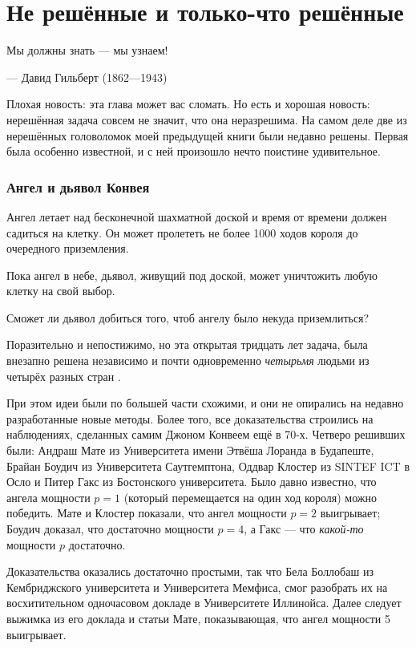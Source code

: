 \chapter{Не решённые и только-что решённые}


\setlength{\epigraphwidth}{.80\textwidth}
\epigraph{Мы должны знать --- мы узнаем!
}{--- Давид Гильберт (1862---1943)}

Плохая новость: эта глава может вас сломать.
Но есть и хорошая новость: нерешённая задача совсем не значит, что она неразрешима.
На самом деле две из нерешённых головоломок моей предыдущей книги были недавно решены.
Первая была особенно известной, и с ней произошло нечто поистине удивительное.

\subsection*{Ангел и дьявол Конвея}

Ангел летает над бесконечной шахматной доской и время от времени
должен садиться на клетку.
Он может пролететь не более 1000 ходов
короля до очередного приземления.

Пока ангел в небе, дьявол, живущий под доской, может уничтожить любую клетку на свой выбор.

Сможет ли дьявол добиться того, чтоб ангелу было некуда приземлиться?

\medskip

Поразительно и непостижимо, но эта открытая тридцать лет задача, была внезапно решена
независимо и почти одновременно
\emph{четырьмя} людьми из четырёх разных стран \cite{10, 20, 40, 43}.

При этом идеи были по большей части схожими, и они не опирались на недавно разработанные новые методы.
Более того, все доказательства строились на наблюдениях, сделанных самим Джоном Конвеем ещё в 70-х.
Четверо решивших были:
Андраш Мате из Университета имени Этвёша Лоранда в Будапеште,
Брайан Боудич из Университета Саутгемптона,
Оддвар Клостер из SINTEF ICT в Осло
и Питер Гакс из Бостонского университета.
Было давно известно, что ангела мощности $p=1$ (который перемещается на один ход короля) можно победить.
Мате и Клостер показали, что ангел мощности $p=2$ выигрывает;
Боудич доказал, что достаточно мощности $p=4$,
а Гакс --- что \emph{какой-то} мощности $p$ достаточно.

Доказательства оказались достаточно простыми, так что Бела Боллобаш из Кембриджского университета и Университета Мемфиса, смог разобрать их на восхитительном одночасовом докладе в Университете Иллинойса.
Далее следует выжимка из его доклада и статьи Мате, показывающая, что ангел мощности 5 выигрывает.

